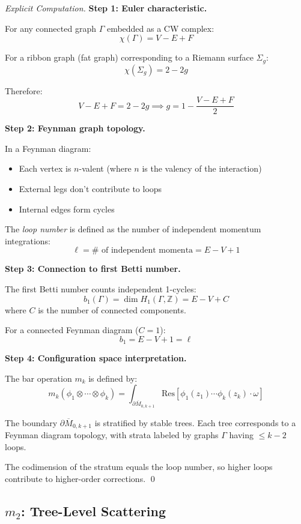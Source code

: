 \begin{proof}[Explicit Computation]
\textbf{Step 1: Euler characteristic.}

For any connected graph $\Gamma$ embedded as a CW complex:
$$\chi(\Gamma) = V - E + F$$

For a ribbon graph (fat graph) corresponding to a Riemann surface $\Sigma_g$:
$$\chi(\Sigma_g) = 2 - 2g$$

Therefore:
$$V - E + F = 2 - 2g \implies g = 1 - \frac{V - E + F}{2}$$

\textbf{Step 2: Feynman graph topology.}

In a Feynman diagram:
\begin{itemize}
\item Each vertex is $n$-valent (where $n$ is the valency of the interaction)
\item External legs don't contribute to loops
\item Internal edges form cycles
\end{itemize}

The \emph{loop number} is defined as the number of independent momentum integrations:
$$\ell = \# \text{ of independent momenta} = E - V + 1$$

\textbf{Step 3: Connection to first Betti number.}

The first Betti number counts independent 1-cycles:
$$b_1(\Gamma) = \dim H_1(\Gamma, \mathbb{Z}) = E - V + C$$
where $C$ is the number of connected components.

For a connected Feynman diagram ($C=1$):
$$b_1 = E - V + 1 = \ell$$

\textbf{Step 4: Configuration space interpretation.}

The bar operation $m_k$ is defined by:
$$m_k(\phi_1 \otimes \cdots \otimes \phi_k) = \int_{\partial\overline{M}_{0,k+1}} 
\text{Res}[\phi_1(z_1) \cdots \phi_k(z_k) \cdot \omega]$$

The boundary $\partial\overline{M}_{0,k+1}$ is stratified by stable trees. Each tree 
corresponds to a Feynman diagram topology, with strata labeled by graphs $\Gamma$ having 
$\leq k-2$ loops.

The codimension of the stratum equals the loop number, so higher loops contribute to 
higher-order corrections.
\qed
\end{proof}

\subsection{$m_2$: Tree-Level Scattering}

